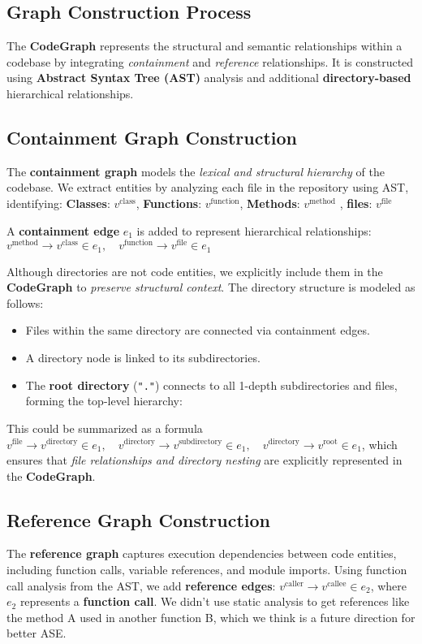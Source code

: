 \subsection{Graph Construction Process}
The \textbf{CodeGraph} represents the structural and semantic relationships within a codebase by integrating \textit{containment} and \textit{reference} relationships. It is constructed using \textbf{Abstract Syntax Tree (AST)} analysis and additional \textbf{directory-based} hierarchical relationships.

\subsection{Containment Graph Construction}
The \textbf{containment graph} models the \textit{lexical and structural hierarchy} of the codebase. We extract entities by analyzing each file in the repository using AST, identifying: \textbf{Classes}: \( v^{\text{class}} \), \textbf{Functions}: \( v^{\text{function}} \), \textbf{Methods}: \( v^{\text{method}} \)
, \textbf{files}: \( v^{\text{file}} \)

A \textbf{containment edge} \( e_1 \) is added to represent hierarchical relationships:
$
    v^{\text{method}} \to v^{\text{class}} \in e_1, \quad v^{\text{function}} \to v^{\text{file}} \in e_1
$

Although directories are not code entities, we explicitly include them in the \textbf{CodeGraph} to \textit{preserve structural context}. The directory structure is modeled as follows:

\begin{itemize}
    \item Files within the same directory are connected via containment edges.
    \item A directory node is linked to its subdirectories.
    \item The \textbf{root directory} (\texttt{"."}) connects to all 1-depth subdirectories and files, forming the top-level hierarchy:
\end{itemize}
This could be summarized as a formula
$v^{\text{file}} \to v^{\text{directory}} \in e_1, \quad 
    v^{\text{directory}} \to v^{\text{subdirectory}} \in e_1, \quad 
    v^{\text{directory}} \to v^{\text{root}} \in e_1$, which ensures that \textit{file relationships and directory nesting} are explicitly represented in the \textbf{CodeGraph}.

\subsection{Reference Graph Construction}
The \textbf{reference graph} captures execution dependencies between code entities, including function calls, variable references, and module imports. Using function call analysis from the AST, we add \textbf{reference edges}: $v^{\text{caller}} \to v^{\text{callee}} \in e_2$, where \( e_2 \) represents a \textbf{function call}. We didn't use static analysis to get references like the method A used in another function B, which we think is a future direction for better ASE. 

